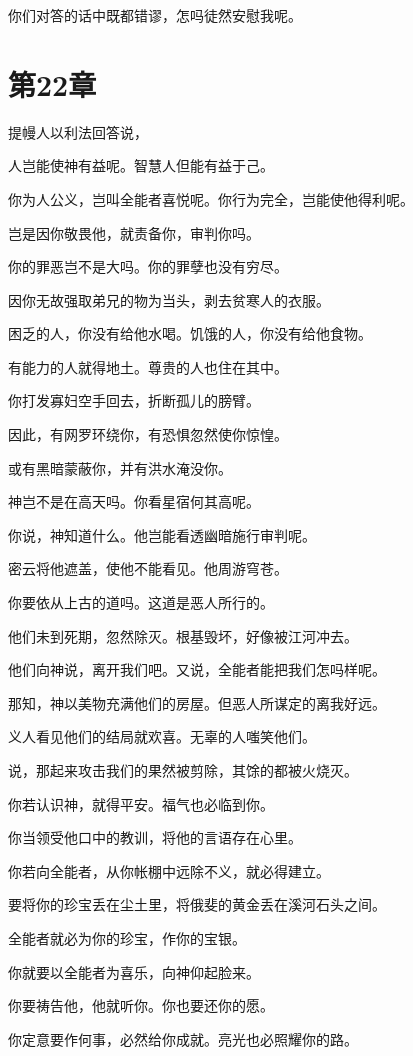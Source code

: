 \documentclass[12pt,oneside]{book}
\begin{document}
你们对答的话中既都错谬，怎吗徒然安慰我呢。


\chapter{第22章}
提幔人以利法回答说，

人岂能使神有益呢。智慧人但能有益于己。

你为人公义，岂叫全能者喜悦呢。你行为完全，岂能使他得利呢。

岂是因你敬畏他，就责备你，审判你吗。

你的罪恶岂不是大吗。你的罪孽也没有穷尽。

因你无故强取弟兄的物为当头，剥去贫寒人的衣服。

困乏的人，你没有给他水喝。饥饿的人，你没有给他食物。

有能力的人就得地土。尊贵的人也住在其中。

你打发寡妇空手回去，折断孤儿的膀臂。

因此，有网罗环绕你，有恐惧忽然使你惊惶。

或有黑暗蒙蔽你，并有洪水淹没你。

神岂不是在高天吗。你看星宿何其高呢。

你说，神知道什么。他岂能看透幽暗施行审判呢。

密云将他遮盖，使他不能看见。他周游穹苍。

你要依从上古的道吗。这道是恶人所行的。

他们未到死期，忽然除灭。根基毁坏，好像被江河冲去。

他们向神说，离开我们吧。又说，全能者能把我们怎吗样呢。

那知，神以美物充满他们的房屋。但恶人所谋定的离我好远。

义人看见他们的结局就欢喜。无辜的人嗤笑他们。

说，那起来攻击我们的果然被剪除，其馀的都被火烧灭。

你若认识神，就得平安。福气也必临到你。

你当领受他口中的教训，将他的言语存在心里。

你若向全能者，从你帐棚中远除不义，就必得建立。

要将你的珍宝丢在尘土里，将俄斐的黄金丢在溪河石头之间。

全能者就必为你的珍宝，作你的宝银。

你就要以全能者为喜乐，向神仰起脸来。

你要祷告他，他就听你。你也要还你的愿。

你定意要作何事，必然给你成就。亮光也必照耀你的路。
\end{document}
